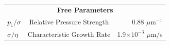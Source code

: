 \documentclass[aps, prl, twocolumn, groupedaddress]{revtex4-1}
\begin{document}
\begin{table}
\begin{ruledtabular}
\begin{tabular}{l c r}
                                                                                                                                                                                                                                                                                                                                                                                                                                                                                                                                  \\
                                                                                                                                                                                                                                                                                                                                                                                                                                                                                                                                  \multicolumn{3}{c}{\textbf{Free Parameters}}\\
                                                                                                                                                                                                                                                                                                                                                                                                                                                                                                                                  $p_1/\sigma$&Relative Pressure Strength&0.88 $\mu$m$^{-1}$\\
                                                                                                                                                                                                                                                                                                                                                                                                                                                                                                                                  $\sigma/\eta$&Characteristic Growth Rate&1.9$\times 10^{-3}$ $\mu$m/s\\
                                                                                                                                                                                                                                                                                                                                                                                                                                                                                                                                \end{tabular}

\end{ruledtabular}
\end{table}
\end{document}
